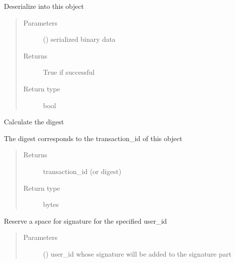 \documentclass[letterpaper,10pt,english]{sphinxmanual}
\begin{document}
\begin{fulllineitems}
\begin{fulllineitems}
\end{fulllineitems}


\begin{fulllineitems}
\label{\detokenize{bbc1.core.bbclib:bbc1.core.bbclib.BBcTransaction.deserialize}}
Deserialize into this object
\begin{quote}\begin{description}
\item[{Parameters}] \leavevmode
{} () \textendash{} serialized binary data

\item[{Returns}] \leavevmode
True if successful

\item[{Return type}] \leavevmode
bool

\end{description}\end{quote}

\end{fulllineitems}


\begin{fulllineitems}
\label{\detokenize{bbc1.core.bbclib:bbc1.core.bbclib.BBcTransaction.digest}}
Calculate the digest

The digest corresponds to the transaction\_id of this object
\begin{quote}\begin{description}
\item[{Returns}] \leavevmode
transaction\_id (or digest)

\item[{Return type}] \leavevmode
bytes

\end{description}\end{quote}

\end{fulllineitems}


\begin{fulllineitems}
\label{\detokenize{bbc1.core.bbclib:bbc1.core.bbclib.BBcTransaction.get_sig_index}}
Reserve a space for signature for the specified user\_id
\begin{quote}\begin{description}
\item[{Parameters}] \leavevmode
{} () \textendash{} user\_id whose signature will be added to the signature part


\end{description}
\end{quote}
\end{fulllineitems}
\end{fulllineitems}
\end{document}
